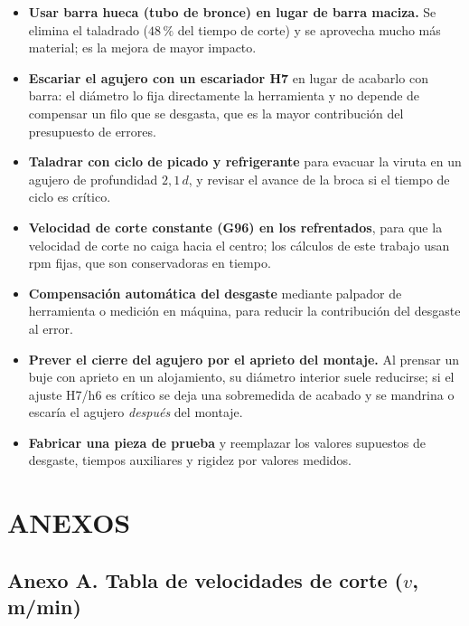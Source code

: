 \documentclass[12pt,a4paper]{article}
\begin{document}
\begin{itemize}
	\item \textbf{Usar barra hueca (tubo de bronce) en lugar de barra maciza.} Se
	      elimina el taladrado ($48\,\%$ del tiempo de corte) y se aprovecha mucho
	      más material; es la mejora de mayor impacto.\\[-10pt]
	\item \textbf{Escariar el agujero con un escariador H7} en lugar de acabarlo
	      con barra: el diámetro lo fija directamente la herramienta y no depende
	      de compensar un filo que se desgasta, que es la mayor contribución del
	      presupuesto de errores.\\[-10pt]
	\item \textbf{Taladrar con ciclo de picado y refrigerante} para evacuar la
	      viruta en un agujero de profundidad $2{,}1\,d$, y revisar el avance de la
	      broca si el tiempo de ciclo es crítico.\\[-10pt]
	\item \textbf{Velocidad de corte constante (G96) en los refrentados}, para que
	      la velocidad de corte no caiga hacia el centro; los cálculos de este
	      trabajo usan rpm fijas, que son conservadoras en tiempo.\\[-10pt]
	\item \textbf{Compensación automática del desgaste} mediante palpador de
	      herramienta o medición en máquina, para reducir la contribución del
	      desgaste al error.\\[-10pt]
	\item \textbf{Prever el cierre del agujero por el aprieto del montaje.} Al
	      prensar un buje con aprieto en un alojamiento, su diámetro interior
	      suele
	      reducirse; si el ajuste H7/h6 es crítico se deja una sobremedida de
	      acabado y se mandrina o escaría el agujero \emph{después} del montaje.
	      \\[-10pt]
	\item \textbf{Fabricar una pieza de prueba} y reemplazar los valores
	      supuestos de desgaste, tiempos auxiliares y rigidez por valores medidos.
\end{itemize}

\newpage
\section{ANEXOS}

\subsection*{Anexo A. Tabla de velocidades de corte ($v$, m/min)}
\end{document}
